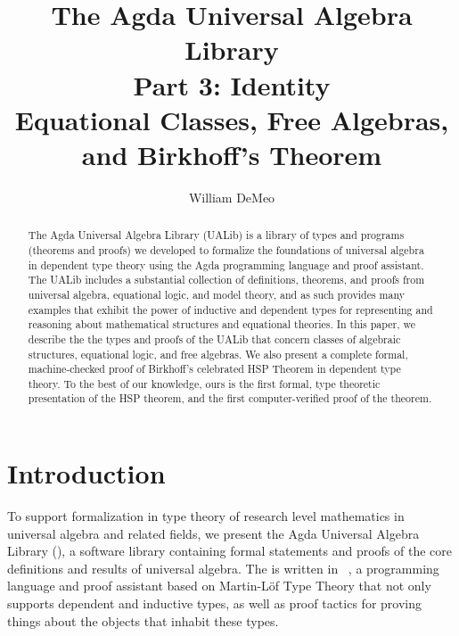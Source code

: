 \documentclass[a4paper,UKenglish,cleveref,autoref,thm-restate,12pt]{../lipics-v2021-wjd}
\title{The Agda Universal Algebra Library\\%
Part 3: Identity\\[-5pt]
{\large Equational Classes, Free Algebras, and Birkhoff's Theorem}}
\author{William DeMeo}
       {Department of Algebra, Charles University in Prague \and \url{https://williamdemeo.gitlab.io}}
       {williamdemeo@gmail.com}{https://orcid.org/0000-0003-1832-5690}{}
\begin{document}
\maketitle


\begin{abstract}
The Agda Universal Algebra Library (UALib) is a library of types and programs (theorems and proofs) we developed to formalize the foundations of universal algebra in dependent type theory using the Agda programming language and proof assistant. 
 The UALib includes a substantial collection of definitions, theorems, and proofs from universal algebra, equational logic, and model theory, and as such provides many examples that exhibit the power of inductive and dependent types for representing and reasoning about mathematical structures and equational theories. In this paper, we describe the the types and proofs of the UALib that concern classes of algebraic structures, equational logic, and free algebras. We also present a complete formal, machine-checked proof of Birkhoff's celebrated HSP Theorem in dependent type theory. To the best of our knowledge, ours is the first formal, type theoretic presentation of the HSP theorem, and the first computer-verified proof of the theorem.\end{abstract}

% 


\setcounter{tocdepth}{2}
\tableofcontents


\section{Introduction}\label{sec:introduction}
To support formalization in type theory of research level mathematics in universal algebra and related fields, we present the Agda Universal Algebra Library (\agdaualib), a software library containing formal statements and proofs of the core definitions and results of universal algebra. 
The \ualib is written in \agda~\cite{Norell:2009}, a programming language and proof assistant based on Martin-L\"of Type Theory that not only supports dependent and inductive types, as well as proof tactics for proving things about the objects that inhabit these types.
\end{document}
